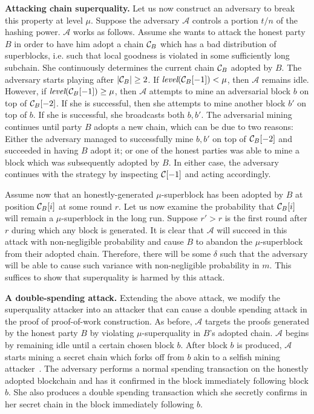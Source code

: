 \noindent
\textbf{Attacking chain superquality.}
\label{subsec.superquality-attack}
Let us now construct an adversary to break this property at level $\mu$. Suppose
the adversary $\mathcal{A}$ controls a portion $t/n$ of the hashing power.
$\mathcal{A}$ works as follows. Assume she wants to attack the honest party $B$
in order to have him adopt a chain $\mathcal{C}_B$ which has a bad distribution of
superblocks, i.e. such that local goodness is violated in some sufficiently long
subchain. She continuously determines the current chain $\mathcal{C}_B$ adopted by
$B$. The adversary starts playing after $|\mathcal{C}_B| \geq 2$. If
$\textit{level}(\mathcal{C}_B[-1]) < \mu$, then $\mathcal{A}$ remains idle. However,
if $\textit{level}(\mathcal{C}_B[-1]) \geq \mu$, then $\mathcal{A}$ attempts to mine
an adversarial block $b$ on top of $\mathcal{C}_B[-2]$. If she is successful, then
she attempts to mine another block $b'$ on top of $b$. If she is successful, she
broadcasts both $b, b'$. The adversarial mining continues until party $B$ adopts
a new chain, which can be due to two reasons: Either the adversary managed to
successfully mine $b, b'$ on top of $\mathcal{C}_B[-2]$ and succeeded in having $B$
adopt it; or one of the honest parties was able to mine a block which was
subsequently adopted by $B$. In either case, the adversary continues with the
strategy by inspecting $\mathcal{C}[-1]$ and acting accordingly.

Assume now that an honestly-generated $\mu$-superblock has been adopted by $B$
at position $\mathcal{C}_B[i]$ at some round $r$. Let us now examine the probability
that $\mathcal{C}_B[i]$ will remain a $\mu$-superblock in the long run. Suppose $r' >
r$ is the first round after $r$ during which any block is generated. It is clear
that $\mathcal{A}$ will succeed in this attack with non-negligible probability
and cause $B$ to abandon the $\mu$-superblock from their adopted chain.
Therefore, there will be some $\delta$ such that the adversary will be able to
cause such variance with non-negligible probability in $m$. This suffices to
show that superquality is harmed by this attack.

\noindent
\textbf{A double-spending attack. }
Extending the above attack, we modify the superquality attacker into an
attacker that can cause a double spending attack in the proof of
proof-of-work construction. As before, $\mathcal{A}$ targets the proofs
generated by the honest party $B$ by violating $\mu$-superquality in $B$'s
adopted chain. $\mathcal{A}$ begins by remaining idle until a certain chosen
block $b$. After block $b$ is produced, $\mathcal{A}$ starts mining a secret
chain which forks off from $b$ akin to a selfish mining attacker~\cite{selfish}.
The adversary performs a normal spending transaction on the honestly adopted
blockchain and has it confirmed in the block immediately following block $b$.
She also produces a double spending transaction which she secretly confirms in
her secret chain in the block immediately following $b$.


